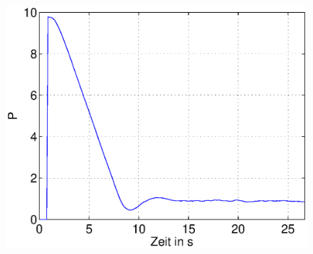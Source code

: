 \begin{frame}
\begin{columns}[c]
\begin{figure}[H]
            \begin{center}
                    \includegraphics[scale=0.3]{./img/plots/Auf_2_b_1_P.eps}
            \end{center}
            \end{figure}
     \end{columns}
\end{frame}
